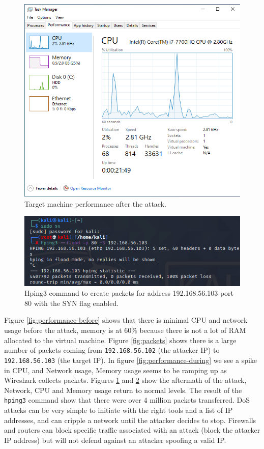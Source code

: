 \begin{figure}[H]
    \centering
    \includegraphics[width=\linewidth]{figures/after_performance.png}
    \caption{Target machine performance after the attack.}
    \label{fig:performance-after}
\end{figure}

\begin{figure}[H]
    \centering
    \includegraphics[width=\linewidth]{figures/hping_command.png}
    \caption{Hping3 command to create packets for address 192.168.56.103 port 80 with the SYN flag enabled.}
    \label{fig:hping}
\end{figure}

\newpage

Figure \ref{fig:performance-before} shows that there is minimal CPU and network usage before the attack, memory is at 60\% because there is not a lot of RAM allocated to the virtual machine.
Figure \ref{fig:packets} shows there is a large number of packets coming from \verb|192.168.56.102| (the attacker IP) to \verb|192.168.56.103| (the target IP).
In figure \ref{fig:performance-during} we see a spike in CPU, and Network usage, Memory usage seems to be ramping up as Wireshark collects packets.
Figures \ref{fig:performance-after} and \ref{fig:hping} show the aftermath of the attack, Network, CPU and Memory usage return to normal levels.
The result of the \verb|hping3| command show that there were over 4 million packets transferred.
DoS attacks can be very simple to initiate with the right tools and a list of IP addresses, and can cripple a network until the attacker decides to stop.
Firewalls and routers can block specific traffic associated with an attack (block the attacker IP address) but will not defend against an attacker spoofing a valid IP.